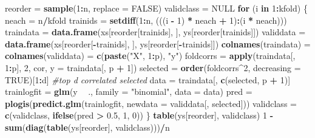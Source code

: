 \documentclass[]{article}
\newenvironment{Shaded}{\begin{snugshade}}{\end{snugshade}}
\newcommand{\KeywordTok}[1]{\textcolor[rgb]{0.13,0.29,0.53}{\textbf{#1}}}
\newcommand{\DataTypeTok}[1]{\textcolor[rgb]{0.13,0.29,0.53}{#1}}
\newcommand{\DecValTok}[1]{\textcolor[rgb]{0.00,0.00,0.81}{#1}}
\newcommand{\FloatTok}[1]{\textcolor[rgb]{0.00,0.00,0.81}{#1}}
\newcommand{\StringTok}[1]{\textcolor[rgb]{0.31,0.60,0.02}{#1}}
\newcommand{\CommentTok}[1]{\textcolor[rgb]{0.56,0.35,0.01}{\textit{#1}}}
\newcommand{\OtherTok}[1]{\textcolor[rgb]{0.56,0.35,0.01}{#1}}
\newcommand{\ControlFlowTok}[1]{\textcolor[rgb]{0.13,0.29,0.53}{\textbf{#1}}}
\newcommand{\OperatorTok}[1]{\textcolor[rgb]{0.81,0.36,0.00}{\textbf{#1}}}
\newcommand{\NormalTok}[1]{#1}
\begin{document}
\begin{Shaded}
\begin{Highlighting}[]
\NormalTok{reorder =}\StringTok{ }\KeywordTok{sample}\NormalTok{(}\DecValTok{1}\OperatorTok{:}\NormalTok{n, }\DataTypeTok{replace =} \OtherTok{FALSE}\NormalTok{)}
\NormalTok{validclass =}\StringTok{ }\OtherTok{NULL}
\ControlFlowTok{for}\NormalTok{ (i }\ControlFlowTok{in} \DecValTok{1}\OperatorTok{:}\NormalTok{kfold) \{}
\NormalTok{    neach =}\StringTok{ }\NormalTok{n}\OperatorTok{/}\NormalTok{kfold}
\NormalTok{    trainids =}\StringTok{ }\KeywordTok{setdiff}\NormalTok{(}\DecValTok{1}\OperatorTok{:}\NormalTok{n, (((i }\OperatorTok{-}\StringTok{ }\DecValTok{1}\NormalTok{) }\OperatorTok{*}\StringTok{ }\NormalTok{neach }\OperatorTok{+}\StringTok{ }\DecValTok{1}\NormalTok{)}\OperatorTok{:}\NormalTok{(i }\OperatorTok{*}\StringTok{ }\NormalTok{neach)))}
\NormalTok{    traindata =}\StringTok{ }\KeywordTok{data.frame}\NormalTok{(xs[reorder[trainids], ], ys[reorder[trainids]])}
\NormalTok{    validdata =}\StringTok{ }\KeywordTok{data.frame}\NormalTok{(xs[reorder[}\OperatorTok{-}\NormalTok{trainids], ], ys[reorder[}\OperatorTok{-}\NormalTok{trainids]])}
    \KeywordTok{colnames}\NormalTok{(traindata) =}\StringTok{ }\KeywordTok{colnames}\NormalTok{(validdata) =}\StringTok{ }\KeywordTok{c}\NormalTok{(}\KeywordTok{paste}\NormalTok{(}\StringTok{"X"}\NormalTok{, }\DecValTok{1}\OperatorTok{:}\NormalTok{p), }\StringTok{"y"}\NormalTok{)}
\NormalTok{    foldcorrs =}\StringTok{ }\KeywordTok{apply}\NormalTok{(traindata[, }\DecValTok{1}\OperatorTok{:}\NormalTok{p], }\DecValTok{2}\NormalTok{, cor, }\DataTypeTok{y =}\NormalTok{ traindata[, p }\OperatorTok{+}\StringTok{ }\DecValTok{1}\NormalTok{])}
\NormalTok{    selected =}\StringTok{ }\KeywordTok{order}\NormalTok{(foldcorrs}\OperatorTok{^}\DecValTok{2}\NormalTok{, }\DataTypeTok{decreasing =} \OtherTok{TRUE}\NormalTok{)[}\DecValTok{1}\OperatorTok{:}\NormalTok{d]  }\CommentTok{#top d correlated selected}
\NormalTok{    data =}\StringTok{ }\NormalTok{traindata[, }\KeywordTok{c}\NormalTok{(selected, p }\OperatorTok{+}\StringTok{ }\DecValTok{1}\NormalTok{)]}
\NormalTok{    trainlogfit =}\StringTok{ }\KeywordTok{glm}\NormalTok{(y }\OperatorTok{~}\StringTok{ }\NormalTok{., }\DataTypeTok{family =} \StringTok{"binomial"}\NormalTok{, }\DataTypeTok{data =}\NormalTok{ data)}
\NormalTok{    pred =}\StringTok{ }\KeywordTok{plogis}\NormalTok{(}\KeywordTok{predict.glm}\NormalTok{(trainlogfit, }\DataTypeTok{newdata =}\NormalTok{ validdata[, selected]))}
\NormalTok{    validclass =}\StringTok{ }\KeywordTok{c}\NormalTok{(validclass, }\KeywordTok{ifelse}\NormalTok{(pred }\OperatorTok{>}\StringTok{ }\FloatTok{0.5}\NormalTok{, }\DecValTok{1}\NormalTok{, }\DecValTok{0}\NormalTok{))}
\NormalTok{\}}
\KeywordTok{table}\NormalTok{(ys[reorder], validclass)}
\DecValTok{1} \OperatorTok{-}\StringTok{ }\KeywordTok{sum}\NormalTok{(}\KeywordTok{diag}\NormalTok{(}\KeywordTok{table}\NormalTok{(ys[reorder], validclass)))}\OperatorTok{/}\NormalTok{n}
\end{Highlighting}
\end{Shaded}
\end{document}
